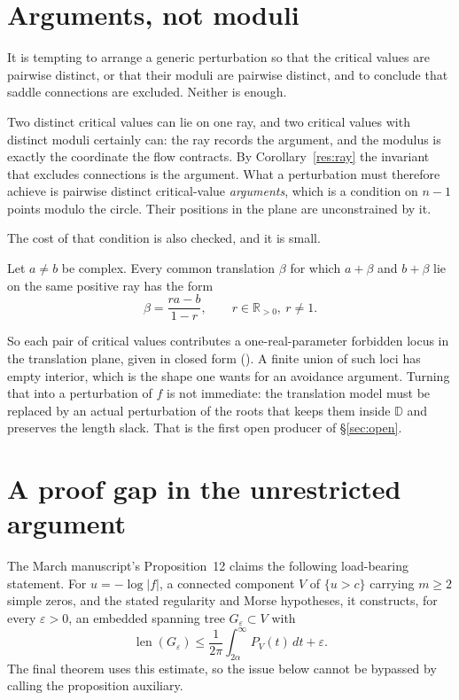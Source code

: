 \documentclass[11pt]{article}
\newcommand{\dbar}{\mathbb{D}}
\begin{document}
\section{Arguments, not moduli}\label{sec:arguments}

It is tempting to arrange a generic perturbation so that the critical values
are pairwise distinct, or that their moduli are pairwise distinct, and to
conclude that saddle connections are excluded.  Neither is enough.

Two distinct critical values can lie on one ray, and two critical values with
distinct moduli certainly can: the ray records the argument, and the modulus is
exactly the coordinate the flow contracts.  By Corollary~\ref{res:ray} the
invariant that excludes connections is the argument.  What a perturbation must
therefore achieve is pairwise distinct critical-value \emph{arguments}, which is
a condition on $n-1$ points modulo the circle.  Their positions in the plane
are unconstrained by it.

The cost of that condition is also checked, and it is small.

\begin{theorem}\label{res:locus}
Let $a\ne b$ be complex.  Every common translation $\beta$ for which $a+\beta$
and $b+\beta$ lie on the same positive ray has the form
\[
  \beta=\frac{ra-b}{1-r},
  \qquad r\in\mathbb{R}_{>0},\ r\ne1 .
\]
\end{theorem}

\noindent So each pair of critical values contributes a one-real-parameter
forbidden locus in the translation plane, given in closed form
().  A finite union of such
loci has empty interior, which is the shape one wants for an avoidance
argument.  Turning that into a perturbation of $f$ is not immediate: the
translation model must be replaced by an actual perturbation of the roots that
keeps them inside $\dbar$ and preserves the length slack.  That is the first
open producer of \S\ref{sec:open}.

\section{A proof gap in the unrestricted argument}\label{sec:gap}

The March manuscript's Proposition~12 claims the following load-bearing
statement.  For $u=-\log|f|$, a connected component $V$ of $\{u>c\}$ carrying
$m\ge2$ simple zeros, and the stated regularity and Morse hypotheses, it
constructs, for every $\varepsilon>0$, an embedded spanning tree
$G_\varepsilon\subset V$ with
\[
 \operatorname{len}(G_\varepsilon)
 \le\frac1{2\pi}\int_{2\alpha}^{\infty}P_V(t)\,dt+\varepsilon.
\tag{5.1}\label{eq:prop12-bound}
\]
The final theorem uses this estimate, so the issue below cannot be bypassed by
calling the proposition auxiliary.
\end{document}
